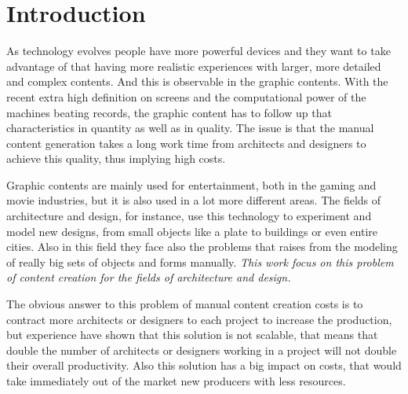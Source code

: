
% 
% 

\section{Introduction}



As technology evolves people have more powerful devices and they want to take advantage of that having more realistic experiences with larger, more detailed and complex contents.
And this is observable in the graphic contents. With the recent extra high definition on screens and the computational power of the machines beating records, the graphic content has to follow up that characteristics in quantity as well as in quality. The issue is that the manual content generation takes a long work time from architects and designers to achieve this quality, thus implying high costs.

Graphic contents are mainly used for entertainment, both in the gaming and movie industries, but it is also used in a lot more different areas. The fields of architecture and design, for instance, use this technology to experiment and model new designs, from small objects like a plate to buildings or even entire cities. Also in this field they face also the problems that raises from the modeling of really big sets of objects and forms manually. \emph{This work focus on this problem of content creation for the fields of architecture and design.}

The obvious answer to this problem of manual content creation costs is to contract more architects or designers to each project to increase the production, but experience have shown that this solution is not scalable, that means that double the number of architects or designers working in a project will not double their overall productivity. Also this solution has a big impact on costs, that would take immediately out of the market new producers with less resources.

